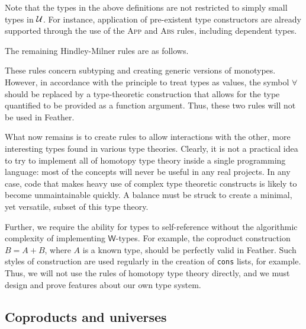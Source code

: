 \documentclass[UKenglish, 11pt, a4paper, parskip=half]{scrbook}
\newcommand{\inlinecode}[1]{\lstinline{#1}}
\begin{document}
Note that the types in the above definitions are not restricted to simply small types in \( \mathcal{U} \).
For instance, application of pre-existent type constructors are already supported through the use of the \textsc{App} and \textsc{Abs} rules, including dependent types.

The remaining Hindley-Milner rules are as follows.
These rules concern subtyping and creating generic versions of monotypes.
However, in accordance with the principle to treat types as values, the symbol \( \forall \) should be replaced by a type-theoretic construction that allows for the type quantified to be provided as a function argument.
Thus, these two rules will not be used in Feather.

What now remains is to create rules to allow interactions with the other, more interesting types found in various type theories.
Clearly, it is not a practical idea to try to implement all of homotopy type theory inside a single programming language: most of the concepts will never be useful in any real projects.
In any case, code that makes heavy use of complex type theoretic constructs is likely to become unmaintainable quickly.
A balance must be struck to create a minimal, yet versatile, subset of this type theory.

Further, we require the ability for types to self-reference without the algorithmic complexity of implementing \( \mathsf{W} \)-types.
For example, the coproduct construction \( B = A + B \), where \( A \) is a known type, should be perfectly valid in Feather.
Such styles of construction are used regularly in the creation of \inlinecode{cons} lists, for example.
Thus, we will not use the rules of homotopy type theory directly, and we must design and prove features about our own type system.


\subsection{Coproducts and universes}
\end{document}
